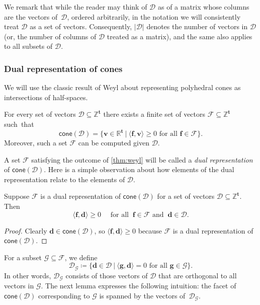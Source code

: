 \documentclass{theoretics}
\renewcommand{\geq}{\geqslant}
\newcommand{\Dd}{\mathcal{D}}
\newcommand{\Z}{\mathbb{Z}}
\newcommand{\R}{\mathbb{R}}
\newcommand{\tup}[1]{{\mathbf{#1}}}
\newcommand{\tv}{\tup t}
\newcommand{\ff}{\tup f}
\renewcommand{\gg}{\tup g}
\newcommand{\dd}{\tup d}
\newcommand{\myvv}{\tup v} %
\newcommand{\Ff}{\mathcal{F}}
\newcommand{\Gg}{\mathcal{G}}
\newcommand{\sca}[2]{\langle #1,#2\rangle}
\newcommand{\realcone}{\mathsf{cone}}
\begin{document}
We remark that while the reader may think of $\Dd$ as of a matrix whose columns are the vectors of~$\Dd$, ordered arbitrarily, in the notation we will consistently treat $\Dd$ as a set of vectors. Consequently, $|\Dd|$ denotes the number of vectors in $\Dd$ (or, the number of columns of $\Dd$ treated as a matrix), and the same also applies to all subsets of $\Dd$.

\subsubsection{Dual representation of cones}

We will use the classic result of Weyl about representing polyhedral cones as intersections of half-spaces.

\begin{theorem}\label{thm:weyl}
 For every set of vectors $\Dd\subseteq \Z^\tv$ there exists a finite set of vectors $\Ff\subseteq \Z^\tv$ such~that
 $$\realcone(\Dd)=\{\myvv\in \R^{\tv}~|~\sca{\ff}{\myvv}\geq 0\textrm{ for all }\ff\in \Ff\}.$$
 Moreover, such a set $\Ff$ can be computed given $\Dd$.
\end{theorem}

A set $\Ff$ satisfying the outcome of \cref{thm:weyl} will be called a {\em{dual representation}} of $\realcone(\Dd)$. Here is a simple observation about how elements of the dual representation relate to the elements of $\Dd$.

\begin{observation}\label{obs:dualPositive}
 Suppose $\Ff$ is a dual representation of $\realcone(\Dd)$ for a set of vectors $\Dd\subseteq \Z^\tv$. Then
 $$\sca{\ff}{\dd}\geq 0\quad \textrm{ for all }\ \ff\in \Ff \textrm{ and }\ \dd\in \Dd.$$
\end{observation}
\begin{proof}
 Clearly $\dd\in \realcone(\Dd)$, so $\sca{\ff}{\dd}\geq 0$ because $\Ff$ is a dual representation of $\realcone(\Dd)$.
\end{proof}

For a subset $\Gg\subseteq \Ff$, we define
$$\Dd_\Gg \coloneqq \{\dd\in \Dd~|~\sca{\gg}{\dd}=0\textrm{ for all }\gg\in \Gg\}.$$
In other words, $\Dd_\Gg$ consists of those vectors of $\Dd$ that are orthogonal to all vectors in $\Gg$. The next lemma expresses the following intuition: the facet of $\realcone(\Dd)$ corresponding to $\Gg$ is spanned by the vectors of~$\Dd_\Gg$.
\end{document}
